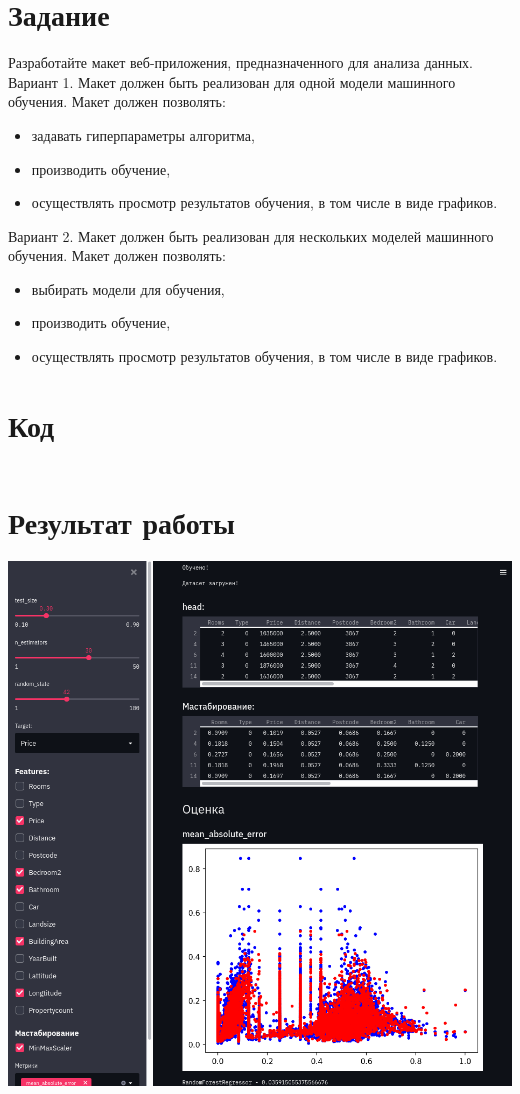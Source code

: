 \documentclass[a4paper]{article}
\begin{document}
  \section*{Задание}
  Разработайте макет веб-приложения, предназначенного для анализа данных. \\
  Вариант 1. Макет должен быть реализован для одной модели машинного обучения. Макет должен позволять: \\
  \begin{itemize}
    \item задавать гиперпараметры алгоритма,
    \item производить обучение,
    \item осуществлять просмотр результатов обучения, в том числе в виде графиков.
  \end{itemize}
  Вариант 2. Макет должен быть реализован для нескольких моделей машинного обучения. Макет должен позволять:
  \begin{itemize}
    \item выбирать модели для обучения,
    \item производить обучение,
    \item осуществлять просмотр результатов обучения, в том числе в виде графиков.
  \end{itemize}

  \section*{Код}
  \inputminted{python}{6.py}

  \section*{Результат работы}
  \includegraphics[scale=0.5]{scr}
\end{document}
